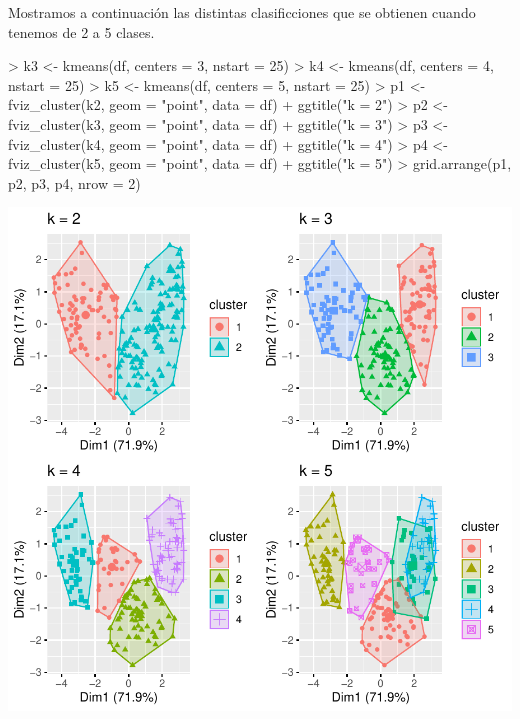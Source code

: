 \documentclass [a4paper] {article}
\begin{document}
Mostramos a continuación las distintas clasificciones que se obtienen cuando tenemos de 2 a 5 clases.
\begin{center}
\begin{Schunk}
\begin{Sinput}
> k3 <- kmeans(df, centers = 3, nstart = 25)
> k4 <- kmeans(df, centers = 4, nstart = 25)
> k5 <- kmeans(df, centers = 5, nstart = 25)
> p1 <- fviz_cluster(k2, geom = "point", data = df) + ggtitle("k = 2")
> p2 <- fviz_cluster(k3, geom = "point",  data = df) + ggtitle("k = 3")
> p3 <- fviz_cluster(k4, geom = "point",  data = df) + ggtitle("k = 4")
> p4 <- fviz_cluster(k5, geom = "point",  data = df) + ggtitle("k = 5")
> grid.arrange(p1, p2, p3, p4, nrow = 2)
\end{Sinput}
\end{Schunk}
\includegraphics{entrega-kmeans_different_number_of_clusters}
\end{center}
\end{document}
